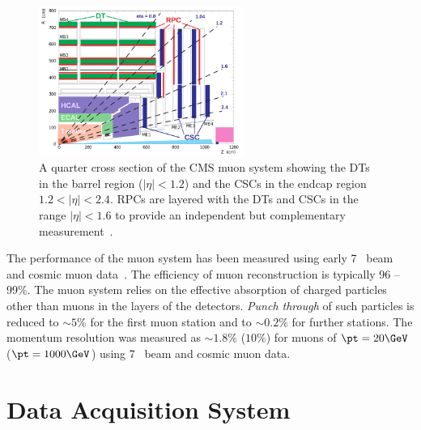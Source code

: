\begin{figure}
\centering
    \includegraphics[width=0.6\textwidth]{./Figures/detector/muon_sys}
  \caption{A quarter cross section of the CMS muon system showing the DTs in the barrel region ($|\eta| < 1.2$) and the CSCs in the endcap
  region $ 1.2 < |\eta| < 2.4$. RPCs are layered with the DTs and CSCs in the range $|\eta| < 1.6$ to provide an independent but complementary measurement~\cite{CMS}.}
  \label{fig:MUON_SLICE}
\end{figure}

The performance of the muon system has been measured using early 7 \TeV~beam and cosmic muon data~\cite{muon_performance}. 
The efficiency of muon reconstruction is typically 96 -- 99\%. The muon system relies on the effective
absorption of charged particles other than muons in the layers of the detectors.
\emph{Punch through} of such particles is reduced to $\sim 5\%$ for the first muon station and to
$\sim 0.2\%$ for further stations. The momentum resolution 
was measured as $\sim 1.8\%$ ($10\%$) for muons of $\pt=20\GeV$ ($\pt=1000\GeV$) 
using 7 \TeV~beam and cosmic muon data. 

\section{Data Acquisition System}


